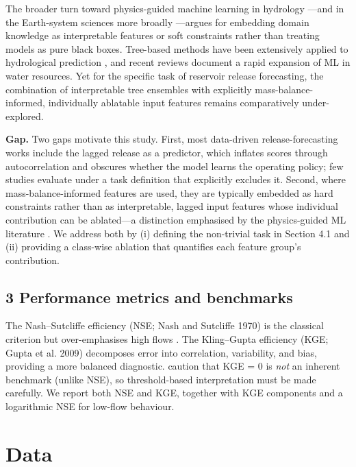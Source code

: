 \documentclass[journal]{ascelike-new}
\begin{document}
The broader turn toward physics-guided machine learning in hydrology \citep{Karpatne2017,Shen2018,Nearing2021}---and in the Earth-system sciences more broadly \citep{Reichstein2019}---argues for embedding domain knowledge as interpretable features or soft constraints rather than treating models as pure black boxes. Tree-based methods have been extensively applied to hydrological prediction \citep{Tyralis2019}, and recent reviews \citep{Lange2024} document a rapid expansion of ML in water resources. Yet for the specific task of reservoir release forecasting, the combination of interpretable tree ensembles with explicitly mass-balance-informed, individually ablatable input features remains comparatively under-explored.


\textbf{Gap.} Two gaps motivate this study. First, most data-driven release-forecasting works include the lagged release as a predictor, which inflates scores through autocorrelation and obscures whether the model learns the operating policy; few studies evaluate under a task definition that explicitly excludes it. Second, where mass-balance-informed features are used, they are typically embedded as hard constraints \citep{Zhou2025} rather than as interpretable, lagged input features whose individual contribution can be ablated---a distinction emphasised by the physics-guided ML literature \citep{Karpatne2017,Shen2018}. We address both by (i) defining the non-trivial task in Section 4.1 and (ii) providing a class-wise ablation that quantifies each feature group's contribution.


\subsection{3 Performance metrics and benchmarks}


The Nash--Sutcliffe efficiency (NSE; Nash and Sutcliffe 1970) is the classical criterion but over-emphasises high flows \citep{Mathevet2006}. The Kling--Gupta efficiency (KGE; Gupta et al. 2009) decomposes error into correlation, variability, and bias, providing a more balanced diagnostic. \citet{Knoben2019} caution that KGE = 0 is \emph{not} an inherent benchmark (unlike NSE), so threshold-based interpretation must be made carefully. We report both NSE and KGE, together with KGE components and a logarithmic NSE for low-flow behaviour.



\section{Data}
\end{document}

